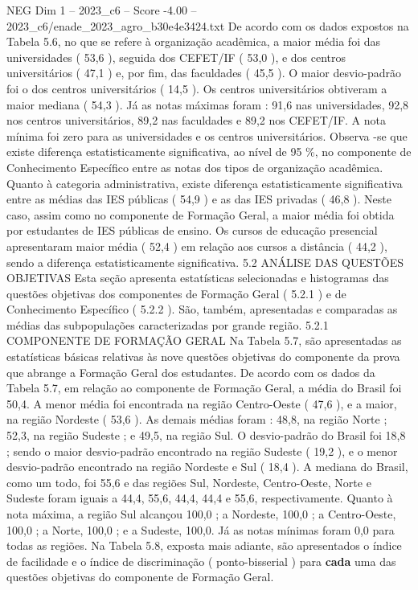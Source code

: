 \begin{textsample}{NEG Dim 1 – 2023\_c6 – Score -4.00 – 2023\_c6/enade\_2023\_agro\_b30e4e3424.txt}
De acordo com os dados expostos na Tabela 5.6, no que se refere à organização acadêmica, a maior média foi das universidades ( 53,6 ), seguida dos CEFET/IF ( 53,0 ), e dos centros universitários ( 47,1 ) e, por fim, das faculdades ( 45,5 ).
O maior desvio-padrão foi o dos centros universitários ( 14,5 ).
Os centros universitários obtiveram a maior mediana ( 54,3 ).
Já as notas máximas foram : 91,6 nas universidades, 92,8 nos centros universitários, 89,2 nas faculdades e 89,2 nos CEFET/IF.
A nota mínima foi zero para as universidades e os centros universitários.
Observa -se que existe diferença estatisticamente significativa, ao nível de 95 \%, no componente de Conhecimento Específico entre as notas dos tipos de organização acadêmica.
Quanto à categoria administrativa, existe diferença estatisticamente significativa entre as médias das IES públicas ( 54,9 ) e as das IES privadas ( 46,8 ).
Neste caso, assim como no componente de Formação Geral, a maior média foi obtida por estudantes de IES públicas de ensino.
Os cursos de educação presencial apresentaram maior média ( 52,4 ) em relação aos cursos a distância ( 44,2 ), sendo a diferença estatisticamente significativa. 5.2 ANÁLISE DAS QUESTÕES OBJETIVAS Esta seção apresenta estatísticas selecionadas e histogramas das questões objetivas dos componentes de Formação Geral ( 5.2.1 ) e de Conhecimento Específico ( 5.2.2 ).
São, também, apresentadas e comparadas as médias das subpopulações caracterizadas por grande região. 5.2.1 COMPONENTE DE FORMAÇÃO GERAL Na Tabela 5.7, são apresentadas as estatísticas básicas relativas às nove questões objetivas do componente da prova que abrange a Formação Geral dos estudantes.
De acordo com os dados da Tabela 5.7, em relação ao componente de Formação Geral, a média do Brasil foi 50,4.
A menor média foi encontrada na região Centro-Oeste ( 47,6 ), e a maior, na região Nordeste ( 53,6 ).
As demais médias foram : 48,8, na região Norte ; 52,3, na região Sudeste ; e 49,5, na região Sul.
O desvio-padrão do Brasil foi 18,8 ; sendo o maior desvio-padrão encontrado na região Sudeste ( 19,2 ), e o menor desvio-padrão encontrado na região Nordeste e Sul ( 18,4 ).
A mediana do Brasil, como um todo, foi 55,6 e das regiões Sul, Nordeste, Centro-Oeste, Norte e Sudeste foram iguais a 44,4, 55,6, 44,4, 44,4 e 55,6, respectivamente.
Quanto à nota máxima, a região Sul alcançou 100,0 ; a Nordeste, 100,0 ; a Centro-Oeste, 100,0 ; a Norte, 100,0 ; e a Sudeste, 100,0.
Já as notas mínimas foram 0,0 para todas as regiões.
Na Tabela 5.8, exposta mais adiante, são apresentados o índice de facilidade e o índice de discriminação ( ponto-bisserial ) para \textbf{cada} uma das questões objetivas do componente de Formação Geral.

\end{textsample}
